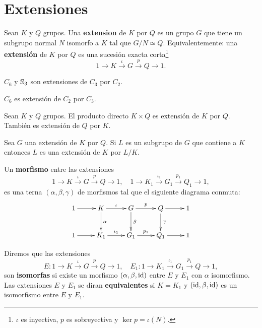 \chapter{Extensiones}
\label{extensiones}

\begin{definition}
	Sean $K$ y $Q$ grupos. Una \textbf{extension} de $K$ por $Q$ es un grupo
	$G$ que tiene un subgrupo normal $N$ isomorfo a $K$ tal que $G/N\simeq Q$.
	Equivalentemente: una \textbf{extensión} de $K$ por $Q$ es una sucesión
	exacta corta\footnote{$\iota$ es inyectiva, $p$ es sobreyectiva y $\ker
	p=\iota(N)$.}
	\[
	1\to K\xrightarrow{\iota}G\xrightarrow{p} Q\to1.
	\]
\end{definition}

\begin{example}
	$C_6$ y $\mathbb{S}_3$ son extensiones de $C_3$ por $C_2$.
\end{example}

\begin{example}
	$C_6$ es extensión de $C_2$ por $C_3$.
\end{example}

\begin{example}
	Sean $K$ y $Q$ grupos. El producto directo $K\times Q$ es extensión de $K$
	por $Q$. También es extensión de $Q$ por $K$.
\end{example}

	Sea $G$ una extensión de $K$ por $Q$. Si $L$ es un subgrupo de $G$ que
	contiene a $K$ entonces $L$ es una extensión de $K$ por $L/K$. 

\begin{definition}
	Un \textbf{morfismo} entre las extensiones 
	\[
	1\to K\xrightarrow{\iota}G\xrightarrow{p} Q\to1,
	\quad
	1\to K_1\xrightarrow{\iota_1}G_1\xrightarrow{p_1} Q_1\to1,
	\]
	es una terna $(\alpha,\beta,\gamma)$ de morfismos tal que el siguiente
	diagrama conmuta:
	\[
	\xymatrix{
	1\ar[r] 
	& K
	\ar[d]^\alpha
	\ar[r]^-{\iota}
	& G
	\ar[r]^-{p}
	\ar[d]^\beta
	& Q\ar[r]
	\ar[d]^\gamma
	& 1
	\\
	1\ar[r] 
	& K_1
	\ar[r]^-{\iota_{1}}
	& G_1
	\ar[r]^-{p_{1}}
	& Q_1\ar[r]
	& 1
	}
	\]
\end{definition}

\begin{definition}
	Diremos que las extensiones 
	\[
	E\colon 1\to K\xrightarrow{\iota}G\xrightarrow{p} Q\to1,
	\quad
	E_1\colon 1\to K_1\xrightarrow{\iota_1}G_1\xrightarrow{p_1} Q\to1,
	\]
	son \textbf{isomorfas} si existe un morfismo $(\alpha,\beta,\operatorname{id})$ entre $E$
	y $E_1$ con $\alpha$ isomorfismo. Las extensiones $E$ y $E_1$ se diran
	\textbf{equivalentes} si $K=K_1$ y $(\operatorname{id},\beta,\operatorname{id})$ es un isomorfismo
	entre $E$ y $E_1$.
\end{definition}

